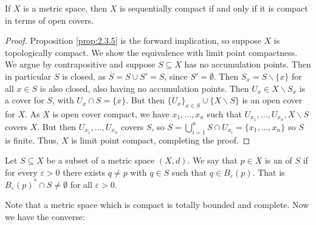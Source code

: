 \begin{namthm}\label{thm:2.3.6}
    If $X$ is a metric space, then $X$ is sequentially compact if and only if it is compact in terms of open covers.
\end{namthm}
\begin{proof}
    Proposition \ref{prop:2.3.5} is the forward implication, so suppose $X$ is topologically compact. We show the equivalence with limit point compactness. We argue by contrapositive and suppose $S \subseteq X$ has no accumulation points. Then in particular $S$ is closed, as $\overline{S} = S \cup S' = S$, since $S' = \emptyset$. Then $S_x = S\backslash \{x\}$ for all $x \in S$ is also closed, also having no accumulation points. Then $U_x \in X\backslash S_x$ is a cover for $S$, with $U_x \cap S = \{x\}$. But then $\{U_x\}_{x \in S}\cup\{X\backslash S\}$ is an open cover for $X$. As $X$ is open cover compact, we have $x_1,...,x_n$ such that $U_{x_1},...,U_{x_n},X\backslash S$ covers $X$. But then $U_{x_1},...,U_{x_n}$ covers $S$, so $S = \bigcup_{i=1}^nS\cap U_{x_i} = \{x_1,...,x_n\}$ so $S$ is finite. Thus, $X$ is limit point compact, completing the proof.
\end{proof}

\begin{defn}
    Let $S \subseteq X$ be a subset of a metric space $(X,d)$. We say that $p \in X$ is an  of $S$ if for every $\varepsilon > 0$ there exists $q \neq p$ with $q \in S$ such that $q \in B_{\varepsilon}(p)$. That is $B_{\varepsilon}(p)^*\cap S \neq \emptyset$ for all $\varepsilon > 0$.
\end{defn}


Note that a metric space which is compact is totally bounded and complete. Now we have the converse:

